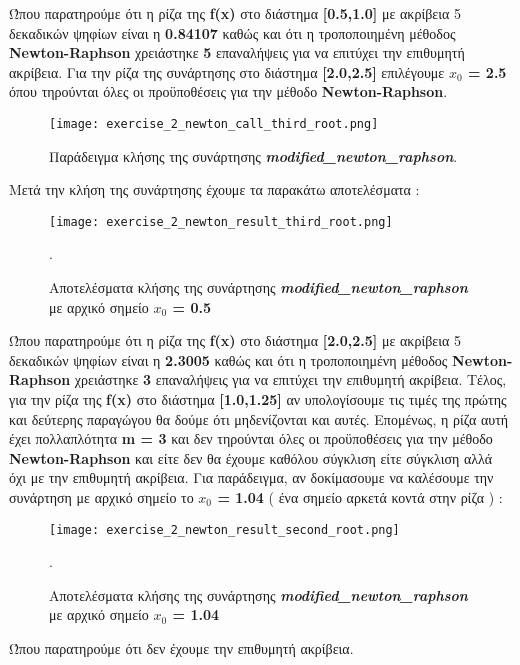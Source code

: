\documentclass[First Project.tex]{subfiles}
\begin{document}
Ώπου παρατηρούμε ότι η ρίζα της \textlatin{\textbf{f(x)}} στο διάστημα \textbf{[0.5,1.0]} με ακρίβεια 5 δεκαδικών ψηφίων 
είναι η \textbf{0.84107} καθώς και ότι η τροποποιημένη μέθοδος \textlatin{\textbf{Newton-Raphson}} χρειάστηκε \textbf{5} επαναλήψεις για να επιτύχει την 
επιθυμητή ακρίβεια. Για την ρίζα της συνάρτησης στο διάστημα \textbf{[2.0,2.5]} επιλέγουμε \textlatin{\textbf{ $x_{0}$ = 2.5}} όπου τηρούνται 
όλες οι προϋποθέσεις για την μέθοδο \textlatin{\textbf{Newton-Raphson}}. 
\begin{figure}[h!]
    \centering
    \captionsetup{justification=centering}
    \begin{center}
        \texttt{[image: exercise\_2\_newton\_call\_third\_root.png]}    
        \caption{Παράδειγμα κλήσης της συνάρτησης \textit{\textlatin{\textbf{modified\_newton\_raphson}}}.}
    \end{center}
\end{figure}
Μετά την κλήση της συνάρτησης έχουμε τα παρακάτω αποτελέσματα :
\begin{figure}[h!]
    \centering
    \captionsetup{justification=centering}
    \begin{center}
    \texttt{[image: exercise\_2\_newton\_result\_third\_root.png]}    
    \caption{ Αποτελέσματα κλήσης της συνάρτησης \textit{\textlatin{\textbf{modified\_newton\_raphson}}} \\ με αρχικό σημείο 
                \textlatin{\textbf{$x_{0}$ = 0.5}}}.
    \end{center}
\end{figure}

Ώπου παρατηρούμε ότι η ρίζα της \textlatin{\textbf{f(x)}} στο διάστημα \textbf{[2.0,2.5]} με ακρίβεια 5 δεκαδικών ψηφίων 
είναι η \textbf{2.3005} καθώς και ότι η τροποποιημένη μέθοδος \textlatin{\textbf{Newton-Raphson}} χρειάστηκε \textbf{3} επαναλήψεις για να επιτύχει την 
επιθυμητή ακρίβεια. Τέλος, για την ρίζα της \textlatin{\textbf{f(x)}} στο διάστημα \textbf{[1.0,1.25]} αν υπολογίσουμε τις τιμές της πρώτης
και δεύτερης παραγώγου θα δούμε ότι μηδενίζονται και αυτές. Επομένως, η ρίζα αυτή έχει πολλαπλότητα \textlatin{\textbf{m = 3}} και δεν
τηρούνται όλες οι προϋποθέσεις για την μέθοδο \textlatin{\textbf{Newton-Raphson}} και είτε δεν θα έχουμε καθόλου σύγκλιση είτε 
σύγκλιση αλλά όχι με την επιθυμητή ακρίβεια. Για παράδειγμα, αν δοκίμασουμε να καλέσουμε την συνάρτηση με αρχικό σημείο το 
\textlatin{\textbf{ $x_{0}$ = 1.04}} ( ένα σημείο αρκετά κοντά στην ρίζα ) :
\begin{figure}[h!]
    \centering
    \captionsetup{justification=centering}
    \begin{center}
    \texttt{[image: exercise\_2\_newton\_result\_second\_root.png]}    
    \caption{ Αποτελέσματα κλήσης της συνάρτησης \textit{\textlatin{\textbf{modified\_newton\_raphson}}} \\ με αρχικό σημείο 
                \textlatin{\textbf{$x_{0}$ = 1.04}}}.
    \end{center}
\end{figure}

Ώπου παρατηρούμε ότι δεν έχουμε την επιθυμητή ακρίβεια.
\end{document}

